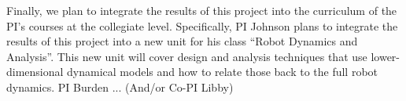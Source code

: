 \documentclass[11pt]{article}
\begin{document}
Finally, we plan to integrate the results of this project into the curriculum of the PI's courses at the collegiate level. Specifically, PI Johnson plans to integrate the results of this project into a new unit for his class ``Robot Dynamics and Analysis''. This new unit will cover design and analysis techniques that use lower-dimensional dynamical models and how to relate those back to the full robot dynamics. PI Burden ... (And/or Co-PI Libby)

\end{document}
